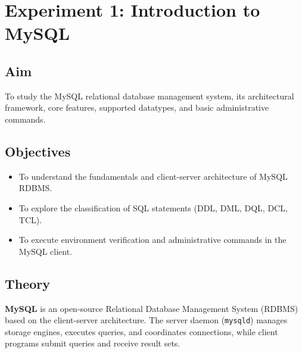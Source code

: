 \section{Experiment 1: Introduction to MySQL}
\label{exp:intro_mysql}

\subsection*{Aim}
To study the MySQL relational database management system, its architectural framework, core features, supported datatypes, and basic administrative commands.

\subsection*{Objectives}
\begin{itemize}[noitemsep,topsep=2pt]
    \item To understand the fundamentals and client-server architecture of MySQL RDBMS.
    \item To explore the classification of SQL statements (DDL, DML, DQL, DCL, TCL).
    \item To execute environment verification and administrative commands in the MySQL client.
\end{itemize}

\subsection*{Theory}
\textbf{MySQL} is an open-source Relational Database Management System (RDBMS) based on the client-server architecture. The server daemon (\texttt{mysqld}) manages storage engines, executes queries, and coordinates connections, while client programs submit queries and receive result sets.

